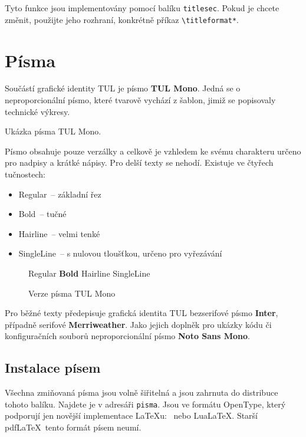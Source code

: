 \documentclass[a4paper,12pt,twoside]{article}
\newcommand{\cmdfont}[1]{\texttt{\color{\tulcolor}#1}}
\newcommand{\cmdnoindex}[1]{\cmdfont{\textbackslash #1}}
\begin{document}
Tyto funkce jsou implementovány pomocí balíku \cmdfont{titlesec}. Pokud je
chcete změnit, použijte jeho rozhraní, konkrétně příkaz
\cmdnoindex{titleformat*}.


\section{Písma}\label{pisma}

Součástí grafické identity TUL je písmo \textbf{TUL Mono}. Jedná se o
neproporcionální písmo, které tvarově vychází z šablon, jimiž se
popisovaly technické výkresy.

{\TULmono Ukázka písma TUL Mono.}

Písmo obsahuje pouze verzálky a celkově je vzhledem ke svému charakteru určeno
pro nadpisy a krátké nápisy. Pro delší texty se nehodí. Existuje ve čtyřech
tučnostech:

\begin{itemize}\setlength{\itemsep}{0pt}
\item Regular~-- základní řez
\item Bold~-- tučné
\item Hairline~-- velmi tenké
\item SingleLine~-- s nulovou tloušťkou, určeno pro vyřezávání
\end{itemize}

\begin{figure}[htp]
\begin{center}
{Regular \TULmono \textbf{Bold} Hairline
SingleLine}\\
\end{center}
\caption{Verze písma TUL Mono}
\label{tul-mono}
\end{figure}

Pro běžné texty předepisuje grafická identita TUL bezserifové písmo
\textbf{Inter}, případně serifové \textbf{Merriweather}. Jako jejich doplněk
pro ukázky kódu či konfiguračních souborů neproporcionální písmo \textbf{Noto
Sans Mono}.


\subsection{Instalace písem}

Všechna zmiňovaná písma jsou volně šiřitelná a jsou zahrnuta do distribuce
tohoto balíku. Najdete je v adresáři \cmdfont{pisma}. Jsou ve formátu OpenType,
který podporují jen novější implementace \LaTeX u: \XeLaTeX\ nebo Lua\LaTeX.
Starší pdf\LaTeX\ tento formát písem neumí.
\end{document}
